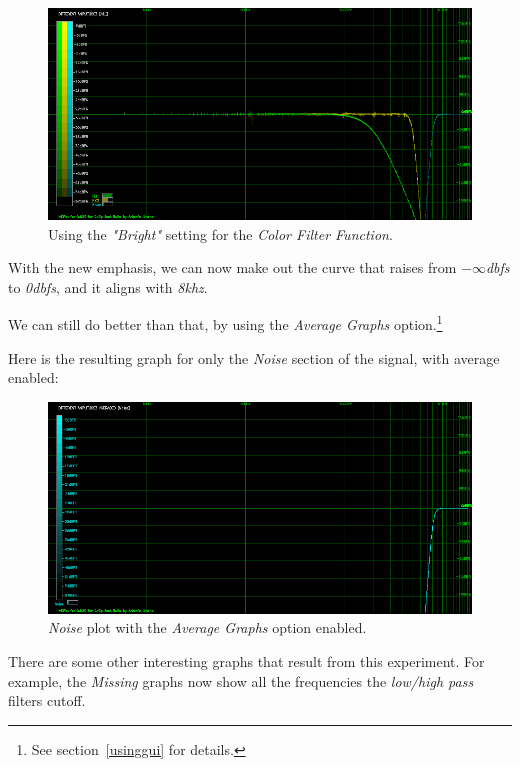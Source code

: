 \documentclass[10pt,a4paper]{report}
\newcommand{\khz}[1]{\textit{\mbox{#1\acrshort{khz}}}}
\newcommand{\db}[1]{\textit{\mbox{#1\acrshort{dbfs}}}}
\begin{document}
\begin{figure}[H]
	\centering
	\includegraphics[width=1.0\linewidth]{images/interpretation/Plot4-2-All-sqrt.png}
	\caption[Using SQRT]{Using the \textit{"Bright"} setting for the \textit{Color Filter Function}.}
	\label{fig:plot4-2-all-sqrt}
\end{figure}

With the new emphasis, we can now make out the curve that raises from \db{$-\infty$} to \db{0}, and it aligns with \khz{8}.

We can still do better than that, by using the \textit{Average Graphs} option.\footnote{See section~\ref{usinggui} for details.}

Here is the resulting graph for only the \textit{Noise} section of the signal, with average enabled:

\begin{figure}[H]
	\centering
	\includegraphics[width=1.0\linewidth]{images/interpretation/Plot4-3-AVG-Noise.png}
	\caption[Noise Average]{\textit{Noise} plot with the \textit{Average Graphs} option enabled.}
	\label{fig:plot4-3-avg-noise}
\end{figure}

There are some other interesting graphs that result from this experiment. For example, the \textit{Missing} graphs now show all the frequencies the \textit{low/high pass} filters cutoff.
\end{document}
